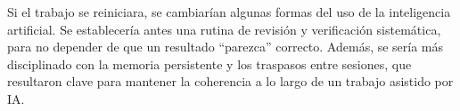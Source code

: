 Si el trabajo se reiniciara, se cambiarían algunas formas del uso de la
inteligencia artificial. Se establecería antes una rutina de revisión y
verificación sistemática, para no depender de que un resultado ``parezca''
correcto. Además, se sería más disciplinado con la memoria persistente y los
traspasos entre sesiones, que resultaron clave para mantener la coherencia a lo
largo de un trabajo asistido por IA.

